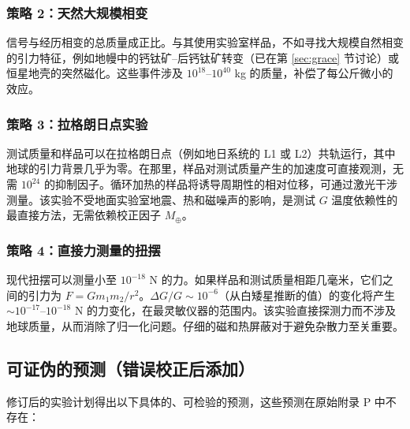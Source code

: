 \documentclass[12pt]{article}
\theoremstyle{remark}
\begin{document}
	\subsubsection*{策略 2：天然大规模相变}
	信号与经历相变的总质量成正比。与其使用实验室样品，不如寻找大规模自然相变的引力特征，例如地幔中的钙钛矿–后钙钛矿转变（已在第 \ref{sec:grace} 节讨论）或恒星地壳的突然磁化。这些事件涉及 $10^{18}$–$10^{40}$ kg 的质量，补偿了每公斤微小的效应。
	
	\subsubsection*{策略 3：拉格朗日点实验}
	测试质量和样品可以在拉格朗日点（例如地日系统的 L1 或 L2）共轨运行，其中地球的引力背景几乎为零。在那里，样品对测试质量产生的加速度可直接观测，无需 $10^{24}$ 的抑制因子。循环加热的样品将诱导周期性的相对位移，可通过激光干涉测量。该实验不受地面实验室地震、热和磁噪声的影响，是测试 $G$ 温度依赖性的最直接方法，无需依赖校正因子 $M_\oplus$。
	
	\subsubsection*{策略 4：直接力测量的扭摆}
	现代扭摆可以测量小至 $10^{-18}$ N 的力。如果样品和测试质量相距几毫米，它们之间的引力为 $F = G m_1 m_2 / r^2$。$\Delta G / G \sim 10^{-6}$（从白矮星推断的值）的变化将产生 $\sim 10^{-17}$–$10^{-18}$ N 的力变化，在最灵敏仪器的范围内。该实验直接探测力而不涉及地球质量，从而消除了归一化问题。仔细的磁和热屏蔽对于避免杂散力至关重要。
	
	\subsection{可证伪的预测（错误校正后添加）}
	\label{subsec:new-predictions}
	
	修订后的实验计划得出以下具体的、可检验的预测，这些预测在原始附录 P 中不存在：
	
\end{document}
